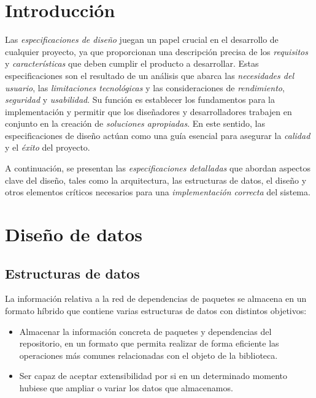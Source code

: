 
\section{Introducción}

Las \textit{especificaciones de diseño} juegan un papel crucial en el desarrollo de cualquier proyecto,
ya que proporcionan una descripción precisa de los \textit{requisitos} y \textit{características} que
deben cumplir el producto a desarrollar. Estas
especificaciones son el resultado de un análisis que abarca
las \textit{necesidades del usuario}, las \textit{limitaciones tecnológicas} y las consideraciones
de \textit{rendimiento}, \textit{seguridad} y \textit{usabilidad}. Su función es establecer
los fundamentos para la implementación y permitir que los diseñadores
y desarrolladores trabajen en conjunto en la creación de \textit{soluciones apropiadas}.
En este sentido, las especificaciones de diseño actúan como una guía esencial para asegurar
la \textit{calidad} y el \textit{éxito} del proyecto.

A continuación, se presentan
las \textit{especificaciones detalladas} que abordan aspectos clave del diseño, tales
como la arquitectura, las estructuras de datos, el diseño y otros
elementos críticos necesarios para una \textit{implementación correcta} del sistema.

\section{Diseño de datos}

\subsection{Estructuras de datos}
La información relativa a la red de dependencias de paquetes se almacena en un formato híbrido
que contiene varias estructuras de datos con distintos objetivos:

\begin{itemize}
    \item Almacenar la información concreta de paquetes y dependencias del repositorio, en un formato
          que permita realizar de forma eficiente las operaciones más comunes relacionadas con el objeto
          de la biblioteca.

    \item Ser capaz de aceptar extensibilidad por si en un determinado momento hubiese que ampliar
          o variar los datos que almacenamos.
\end{itemize}
\

